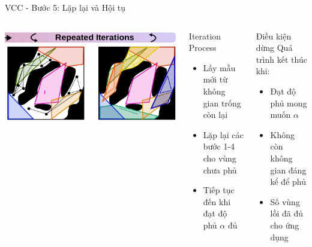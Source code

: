 \documentclass[aspectratio=169]{beamer}
\begin{document}
\begin{frame}{VCC - Bước 5: Lặp lại và Hội tụ}
    \begin{columns}[c]
        \centering
        \includegraphics[width=\textwidth]{imgs/VCC-5.png}

        \begin{block}{Iteration Process}
            \small
            \begin{itemize}
                \item Lấy mẫu mới từ không gian trống còn lại
                \item Lặp lại các bước 1-4 cho vùng chưa phủ
                \item Tiếp tục đến khi đạt độ phủ $\alpha$ đủ
            \end{itemize}
        \end{block}

        \begin{exampleblock}{Điều kiện dừng}
            \small
            Quá trình kết thúc khi:
            \begin{itemize}
                \item Đạt độ phủ mong muốn $\alpha$
                \item Không còn không gian đáng kể để phủ
                \item Số vùng lồi đã đủ cho ứng dụng
            \end{itemize}
        \end{exampleblock}
    \end{columns}
\end{frame}
\end{document}
